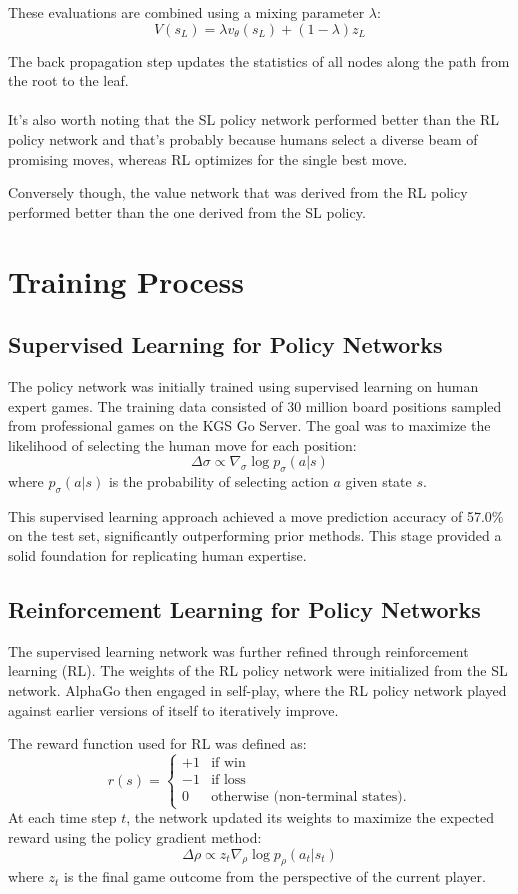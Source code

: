 These evaluations are combined using a mixing parameter \( \lambda \):
\[
V(s_L) = \lambda v_\theta(s_L) + (1 - \lambda) z_L
\]

The back propagation step updates the statistics of all nodes along the path from the root to the leaf.
\\\\
It's also worth noting that the SL policy network performed better than the RL policy network and that's probably  because humans select a diverse beam of promising moves, whereas RL optimizes for the single best move.

Conversely though, the value network that was derived from the RL policy performed better than the one derived from the SL policy.
\section{Training Process}

\subsection{Supervised Learning for Policy Networks}
The policy network was initially trained using supervised learning on human expert games. The training data consisted of 30 million board positions sampled from professional games on the KGS Go Server. The goal was to maximize the likelihood of selecting the human move for each position:
\[
\Delta \sigma \propto \nabla_\sigma \log p_\sigma(a | s)
\]
where \( p_\sigma(a | s) \) is the probability of selecting action \( a \) given state \( s \).

This supervised learning approach achieved a move prediction accuracy of 57.0\% on the test set, significantly outperforming prior methods. This stage provided a solid foundation for replicating human expertise.

\subsection{Reinforcement Learning for Policy Networks}
The supervised learning network was further refined through reinforcement learning (RL). The weights of the RL policy network were initialized from the SL network. AlphaGo then engaged in self-play, where the RL policy network played against earlier versions of itself to iteratively improve.

The reward function used for RL was defined as:
\[
r(s) = 
\begin{cases} 
+1 & \text{if win} \\
-1 & \text{if loss} \\
0 & \text{otherwise (non-terminal states).}
\end{cases}
\]
At each time step \( t \), the network updated its weights to maximize the expected reward using the policy gradient method:
\[
\Delta \rho \propto z_t \nabla_\rho \log p_\rho(a_t | s_t)
\]
where \( z_t \) is the final game outcome from the perspective of the current player.

